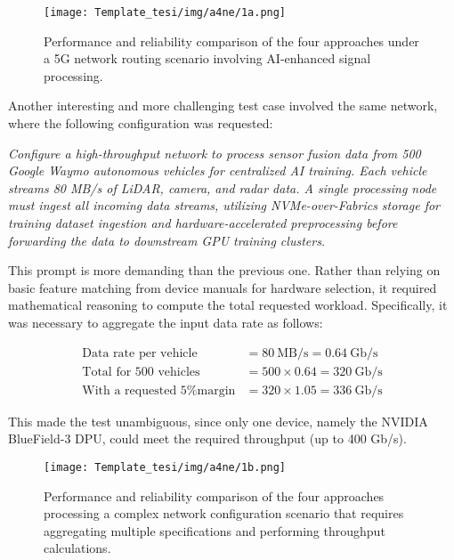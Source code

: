 \begin{figure}[h]
\centering
\texttt{[image: Template\_tesi/img/a4ne/1a.png]}
\caption{Performance and reliability comparison of the four approaches under a 5G network routing scenario involving AI-enhanced signal processing.}
\label{fig:test1a}
\end{figure}


Another interesting and more challenging test case involved the same network, where the following configuration was requested:

\begin{promptboxcontent}
\small\textit{Configure a high-throughput network to process sensor fusion data from 500 Google Waymo autonomous vehicles for centralized AI training. Each vehicle streams 80 MB/s of LiDAR, camera, and radar data. A single processing node must ingest all incoming data streams, utilizing NVMe-over-Fabrics storage for training dataset ingestion and hardware-accelerated preprocessing before forwarding the data to downstream GPU training clusters.}
\end{promptboxcontent}

This prompt is more demanding than the previous one. Rather than relying on basic feature matching from device manuals for hardware selection, it required mathematical reasoning to compute the total requested workload. Specifically, it was necessary to aggregate the input data rate as follows:

\begin{align*}
\text{Data rate per vehicle} &= 80~\text{MB/s} = 0.64~\text{Gb/s} \\
\text{Total for 500 vehicles} &= 500 \times 0.64 = 320~\text{Gb/s} \\
\text{With a requested 5\% margin} &= 320 \times 1.05 = \boxed{336~\text{Gb/s}}
\end{align*}

\noindent
This made the test unambiguous, since only one device, namely the NVIDIA BlueField-3 DPU, could meet the required throughput (up to 400 Gb/s).


\begin{figure}[h]
    \centering
    \texttt{[image: Template\_tesi/img/a4ne/1b.png]}
    \caption{Performance and reliability comparison of the four approaches processing a complex network configuration scenario that requires aggregating multiple specifications and performing throughput calculations.}
    \label{fig:test1b} 
\end{figure}


